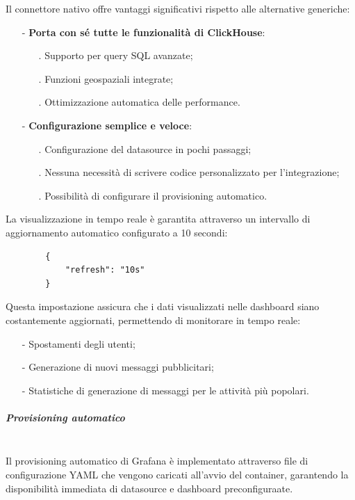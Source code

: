 \documentclass[10pt]{article}
\newcommand{\mysubparagraph}[1]{\subparagraph{#1}\mbox{}\\}
\begin{document}
        Il connettore nativo offre vantaggi significativi rispetto alle alternative generiche:
        
        \begin{itemize}
            \item[-] \textbf{Porta con sé tutte le funzionalità di ClickHouse}:
            \begin{itemize}
            \item[.] Supporto per query SQL avanzate;
            \item[.] Funzioni geospaziali integrate;
            \item[.] Ottimizzazione automatica delle performance.
            \end{itemize}
            \item[-] \textbf{Configurazione semplice e veloce}:
            \begin{itemize}
            \item[.] Configurazione del datasource in pochi passaggi;
            \item[.] Nessuna necessità di scrivere codice personalizzato per l'integrazione;
            \item[.] Possibilità di configurare il provisioning automatico.
            \end{itemize}
        \end{itemize}
        
        La visualizzazione in tempo reale è garantita attraverso un intervallo di aggiornamento automatico configurato a 10 secondi:
        \begin{lstlisting}
        {
            "refresh": "10s"
        }
        \end{lstlisting}

        Questa impostazione assicura che i dati visualizzati nelle dashboard siano costantemente aggiornati, permettendo di monitorare in tempo reale:
        \begin{itemize}
            \item[-] Spostamenti degli utenti;
            \item[-] Generazione di nuovi messaggi pubblicitari;
            \item[-] Statistiche di generazione di messaggi per le attività più popolari.
        \end{itemize}

        \mysubparagraph{Provisioning automatico}
        Il provisioning automatico di Grafana è implementato attraverso file di configurazione YAML che vengono caricati all'avvio del container, garantendo la disponibilità immediata di datasource e dashboard preconfiguraate.
\end{document}
